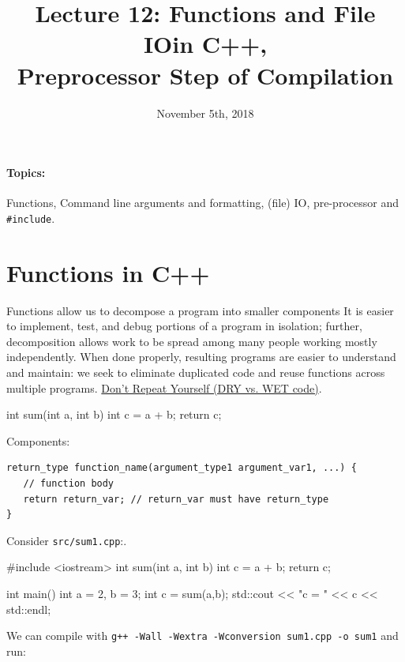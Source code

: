 \documentclass[12pt,letterpaper,twoside]{article}
\begin{document}
\title{Lecture 12: Functions and File IOin C++, \\ Preprocessor Step of Compilation\vspace{-5ex}}
\date{November 5th, 2018}
\maketitle

{\footnotesize
\paragraph{Topics:} Functions, Command line arguments and
formatting, (file) IO, pre-processor and \texttt{\#include}.
}
\vspace{-3ex}

\section{Functions in C++}
Functions allow us to decompose a program into smaller components
It is easier to implement, test, and debug portions of a program in isolation;
further, decomposition allows work to be spread among many people working mostly
independently. When done properly, resulting programs are easier to understand and
maintain: we seek to eliminate duplicated code and reuse functions across 
multiple programs. 
\href{https://en.wikipedia.org/wiki/Don%27t_repeat_yourself#DRY_vs_WET_solutions}
{Don't Repeat Yourself (DRY vs. WET code)}.


\begin{cpp}
int sum(int a, int b) {
  int c = a + b;
  return c;
}
\end{cpp}

Components:

{\footnotesize
\begin{verbatim}
return_type function_name(argument_type1 argument_var1, ...) {
   // function body
   return return_var; // return_var must have return_type
}
\end{verbatim}
}

Consider \texttt{src/sum1.cpp}:.
\begin{cpp}
#include <iostream>
int sum(int a, int b) {
  int c = a + b;
  return c;
}

int main() {
  int a = 2, b = 3;
  int c = sum(a,b);
  std::cout << "c = " << c << std::endl;
}
\end{cpp}

We can compile with \texttt{g++ -Wall -Wextra -Wconversion sum1.cpp -o sum1} and run:
\end{document}
